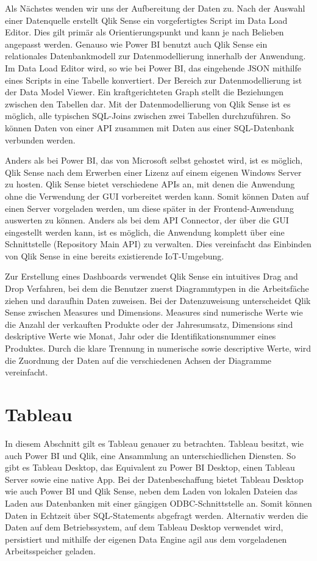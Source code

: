 Als Nächstes wenden wir uns der Aufbereitung der Daten zu. Nach der Auswahl einer Datenquelle
erstellt Qlik Sense ein vorgefertigtes Script im Data Load Editor. Dies gilt primär als Orientierungspunkt
und kann je nach Belieben angepasst werden. Genauso wie Power BI benutzt auch Qlik Sense ein relationales
Datenbankmodell zur Datenmodellierung innerhalb der Anwendung. Im Data Load Editor
wird, so wie bei Power BI, das eingehende JSON mithilfe eines Scripts in eine Tabelle konvertiert.
Der Bereich zur Datenmodellierung ist der Data Model Viewer. Ein kraftgerichteten Graph stellt die
Beziehungen zwischen den Tabellen dar. Mit der Datenmodellierung von Qlik Sense ist es möglich, alle typischen SQL-Joins
zwischen zwei Tabellen durchzuführen. So können Daten von einer API zusammen mit Daten aus einer SQL-Datenbank
verbunden werden.

Anders als bei Power BI, das von Microsoft selbst gehostet wird, ist es möglich, Qlik Sense nach dem Erwerben
einer Lizenz auf einem eigenen Windows Server zu hosten. Qlik Sense bietet verschiedene APIs an,
mit denen die Anwendung ohne die Verwendung der GUI vorbereitet werden kann. Somit können Daten
auf einen Server vorgeladen werden, um diese später in der Frontend-Anwendung auswerten zu können. Anders als bei
dem API Connector, der über die GUI eingestellt werden kann, ist es möglich, die Anwendung komplett über
eine Schnittstelle (Repository Main API) zu verwalten.\cite{QlikSenseRepositoryMainAPI}
Dies vereinfacht das Einbinden von Qlik Sense in eine bereits existierende IoT-Umgebung.

Zur Erstellung eines Dashboards verwendet Qlik Sense ein intuitives Drag and Drop Verfahren,
bei dem die Benutzer zuerst Diagrammtypen in die Arbeitsfäche ziehen und
daraufhin Daten zuweisen. Bei der Datenzuweisung unterscheidet Qlik Sense zwischen Measures und
Dimensions. Measures sind numerische Werte wie die Anzahl der verkauften Produkte oder der Jahresumsatz,
Dimensions sind deskriptive Werte wie Monat, Jahr oder die Identifikationsnummer eines Produktes.\cite{TutorialsSpotMeasuresDimensions}
Durch die klare Trennung in numerische sowie descriptive Werte, wird die Zuordnung der Daten
auf die verschiedenen Achsen der Diagramme vereinfacht.

\section{Tableau}
\label{sec:tableau}
In diesem Abschnitt gilt es Tableau genauer zu betrachten. Tableau besitzt, wie auch Power BI und Qlik,
eine Ansammlung an unterschiedlichen Diensten. So gibt es Tableau Desktop, das Equivalent zu Power BI
Desktop, einen Tableau Server sowie eine native App. Bei der Datenbeschaffung bietet Tableau Desktop wie auch
Power BI und Qlik Sense, neben dem Laden von lokalen Dateien das Laden aus Datenbanken
mit einer gängigen ODBC-Schnittstelle an. Somit können Daten in Echtzeit
über SQL-Statements abgefragt werden. Alternativ werden die Daten auf dem Betriebssystem, auf dem
Tableau Desktop verwendet wird, persistiert und mithilfe der eigenen Data Engine agil aus dem
vorgeladenen Arbeitsspeicher geladen.\cite[S. 50]{ProTableauBook}

